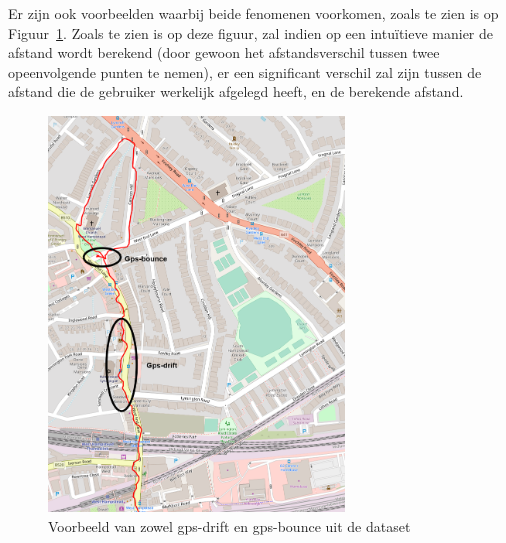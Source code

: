 Er zijn ook voorbeelden waarbij beide fenomenen voorkomen, zoals te zien is op
Figuur~\ref{fig:gps_drift_bounce_Strava}. Zoals te zien is op deze figuur, zal
indien op een intuïtieve manier de afstand wordt berekend (door gewoon het
afstandsverschil tussen twee opeenvolgende punten te nemen), er een significant
verschil zal zijn tussen de afstand die de gebruiker werkelijk afgelegd heeft,
en de berekende afstand.
\begin{figure}
    \centering
    \includegraphics[width=0.7\textwidth]{fig/Afwijkingen&Analyses/Crooked Routes/1_notSnapped.png}
    \caption{Voorbeeld van zowel gps-drift en gps-bounce uit de dataset}\label{fig:gps_drift_bounce_Strava}
\end{figure}

